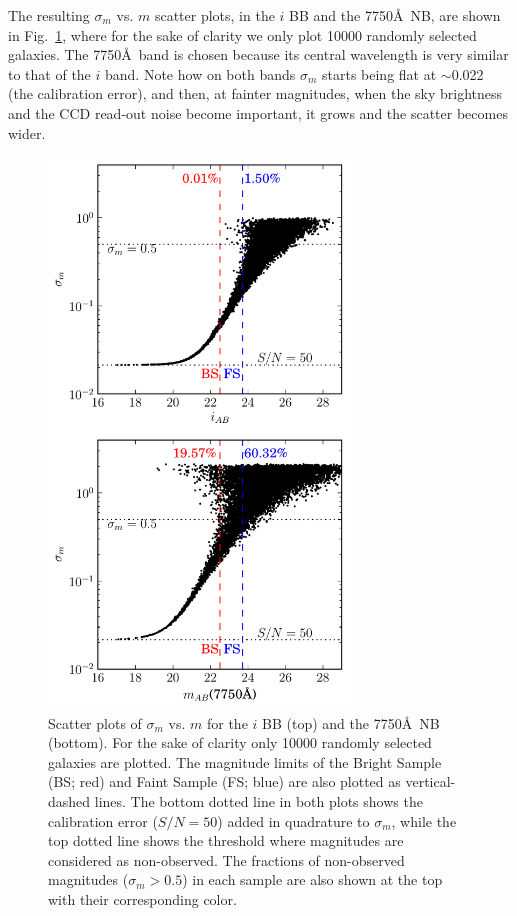 The resulting $\sigma_m$ vs. $m$ scatter plots, in the $i$ BB and the 7750\AA \ NB, are shown in Fig.~\ref{err_m}, where for the sake of clarity we only plot 10000 randomly selected galaxies. The 7750\AA \ band is chosen because its central wavelength is very similar to that of the $i$ band. Note how on both bands $\sigma_m$ starts being flat at $\sim$0.022 (the calibration error), and then, at fainter magnitudes, when the sky brightness and the CCD read-out noise become important, it grows and the scatter becomes wider. 
\begin{figure}
\centering
\includegraphics[width=80mm]{./plots/errm_pau.pdf}
\caption{Scatter plots of $\sigma_m$ vs. $m$ for the $i$ BB (top) and the 7750\AA \ NB (bottom). For the sake of clarity only 10000 randomly selected galaxies are plotted. The magnitude limits of the Bright Sample (BS; red) and Faint Sample (FS; blue) are also plotted as vertical-dashed lines. The bottom dotted line in both plots shows the calibration error ($S/N=50$) added in quadrature to $\sigma_m$, while the top dotted line shows the threshold where magnitudes are considered as non-observed. The fractions of non-observed magnitudes ($\sigma_m>0.5$) in each sample are also shown at the top with their corresponding color.}
\label{err_m}
\end{figure}

